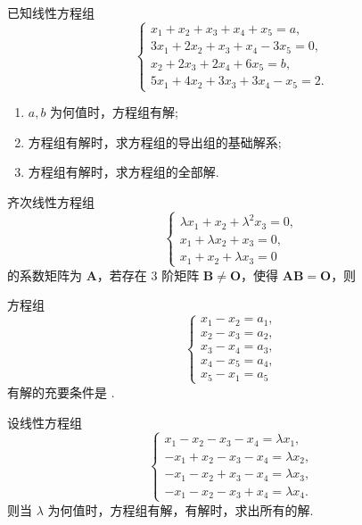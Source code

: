 	\begin{titwo}
		已知线性方程组
		\[
			\begin{cases}
				x_{1} + x_{2} + x_{3} + x_{4} + x_{5} = a, \\
				3x_{1} + 2x_{2} + x_{3} + x_{4} - 3x_{5} = 0, \\
				x_{2} + 2x_{3} + 2x_{4} + 6x_{5} = b, \\
				5x_{1} + 4x_{2} + 3x_{3} + 3x_{4} - x_{5} = 2.
			\end{cases}
		\]
		\begin{enumerate}
			\item $a,b$ 为何值时，方程组有解;
			\item 方程组有解时，求方程组的导出组的基础解系;
			\item 方程组有解时，求方程组的全部解.
		\end{enumerate}
	\end{titwo}

	\begin{titwo}
		齐次线性方程组
		\[
			\begin{cases}
				\lambda x_{1} + x_{2} + \lambda^{2} x_{3} = 0, \\
				x_{1} + \lambda x_{2} + x_{3} = 0, \\
				x_{1} + x_{2} + \lambda x_{3} = 0
			\end{cases}
		\]
		的系数矩阵为 $\bm A$，若存在 $3$ 阶矩阵 $\bm B \ne \bm O$，使得 $\bm A \bm B = \bm O$，则 \kuo

	\end{titwo}

	\begin{titwo}
		方程组
		\[
			\begin{cases}
				x_{1} - x_{2} = a_{1}, \\
				x_{2} - x_{3} = a_{2}, \\
				x_{3} - x_{4} = a_{3}, \\
				x_{4} - x_{5} = a_{4}, \\
				x_{5} - x_{1} = a_{5}
			\end{cases}
		\]
		有解的充要条件是 \htwo.
	\end{titwo}

	\begin{titwo}
		设线性方程组
		\[
			\begin{cases}
				x_{1} - x_{2} - x_{3} - x_{4} = \lambda x_{1}, \\
				-x_{1} + x_{2} - x_{3} - x_{4} = \lambda x_{2}, \\
				-x_{1} - x_{2} + x_{3} - x_{4} = \lambda x_{3}, \\
				-x_{1} - x_{2} - x_{3} + x_{4} = \lambda x_{4}.
			\end{cases}
		\]
		则当 $\lambda$ 为何值时，方程组有解，有解时，求出所有的解.
	\end{titwo}


